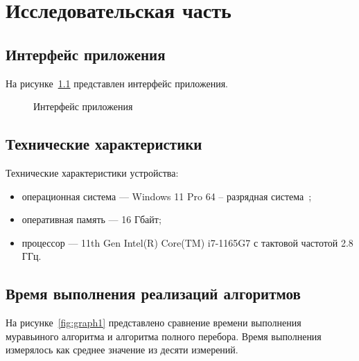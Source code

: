 \chapter{Исследовательская часть}

\section{Интерфейс приложения}

На рисунке~\ref{fig:interface} представлен интерфейс приложения.

\begin{figure}[h!]
	\caption{Интерфейс приложения}
	\label{fig:interface}
\end{figure}

\section{Технические характеристики}

Технические характеристики устройства:

\begin{itemize}
	\item операционная система --- Windows 11 Pro 64 -- разрядная система~\cite{windows};
	\item оперативная память --- 16 Гбайт;
	\item процессор --- 11th Gen Intel(R) Core(TM) i7-1165G7 с тактовой частотой 2.8 ГГц.
\end{itemize}

\section{Время выполнения реализаций алгоритмов}

На рисунке~\ref{fig:graph1} представлено сравнение времени выполнения муравьиного алгоритма и алгоритма полного перебора.
Время выполнения измерялось как среднее значение из десяти измерений.

